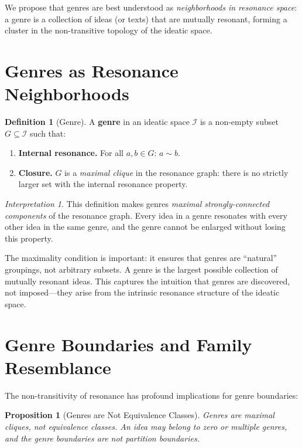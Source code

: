 \documentclass[11pt,openany]{book}
\theoremstyle{definition}
\newtheorem{definition}[axiom]{Definition}
\theoremstyle{plain}
\newtheorem{proposition}[axiom]{Proposition}
\theoremstyle{remark}
\newtheorem{interpretation}[axiom]{Interpretation}
\newcommand{\IS}{\mathcal{I}}               %
\newcommand{\res}{\sim}                      %
\begin{document}
We propose that genres are best understood as \emph{neighborhoods in resonance space}: a genre is a collection of ideas (or texts) that are mutually resonant, forming a cluster in the non-transitive topology of the ideatic space.

\section{Genres as Resonance Neighborhoods}

\begin{definition}[Genre]
A \textbf{genre} in an ideatic space $\IS$ is a non-empty subset $G \subseteq \IS$ such that:
\begin{enumerate}
\item \textbf{Internal resonance.} For all $a, b \in G$: $a \res b$.
\item \textbf{Closure.} $G$ is a \emph{maximal clique} in the resonance graph: there is no strictly larger set with the internal resonance property.
\end{enumerate}
\end{definition}

\begin{interpretation}
This definition makes genres \emph{maximal strongly-connected components} of the resonance graph. Every idea in a genre resonates with every other idea in the same genre, and the genre cannot be enlarged without losing this property.

The maximality condition is important: it ensures that genres are ``natural'' groupings, not arbitrary subsets. A genre is the largest possible collection of mutually resonant ideas. This captures the intuition that genres are discovered, not imposed---they arise from the intrinsic resonance structure of the ideatic space.
\end{interpretation}

\section{Genre Boundaries and Family Resemblance}

The non-transitivity of resonance has profound implications for genre boundaries:

\begin{proposition}[Genres are Not Equivalence Classes]
Genres are maximal cliques, not equivalence classes. An idea may belong to zero or multiple genres, and the genre boundaries are not partition boundaries.
\end{proposition}
\end{document}
